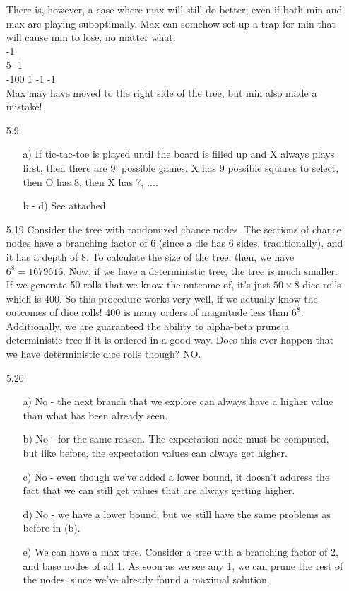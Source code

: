 \documentclass{article}
\begin{document}
\begin{enumerate}
There is, however, a case where max will still do better, even if both min and max are playing suboptimally.  Max can somehow set up a trap for min that will cause min to lose, no matter what: \\
-1\\
5 -1  \\
-100 1 -1 -1 \\
Max may have moved to the right side of the tree, but min also made a mistake!
\item[5.9]
\begin{enumerate}
\item[a)] If tic-tac-toe is played until the board is filled up and X always plays first, then there are 9! possible games.  X has 9 possible squares to select, then O has 8, then X has 7, ....  
\item[b - d)] See attached
\end{enumerate}
\item[5.19] Consider the tree with randomized chance nodes.  The sections of chance nodes have a branching factor of 6 (since a die has 6 sides, traditionally), and it has a depth of 8.  To calculate the size of the tree, then, we have $6^8 = 1679616$.  Now, if we have a deterministic tree, the tree is much smaller.  If we generate 50 rolls that we know the outcome of, it's just $50 \times 8$ dice rolls which is 400.  So this procedure works very well, if we actually know the outcomes of dice rolls!  400 is many orders of magnitude less than $6^8$.  Additionally, we are guaranteed the ability to alpha-beta prune a deterministic tree if it is ordered in a good way.  Does this ever happen that we have deterministic dice rolls though?  NO.
\item[5.20] \begin{enumerate}
\item[a)] No - the next branch that we explore can always have a higher value than what has been already seen.
\item[b)] No - for the same reason.  The expectation node must be computed, but like before, the expectation values can always get higher.
\item[c)] No - even though we've added a lower bound, it doesn't address the fact that we can still get values that are always getting higher.  
\item[d)] No - we have a lower bound, but we still have the same problems as before in (b).  
\item[e)] We can have a max tree.  Consider a tree with a branching factor of 2, and base nodes of all 1.  As soon as we see any 1, we can prune the rest of the nodes, since we've already found a maximal solution.

\end{enumerate}
\end{enumerate}
\end{document}
